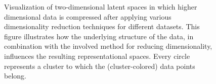 \begin{figure}[H]
\begin{adjustwidth}{-5cm}{-5cm}
{      \begin{adjustbox}{clip,trim=0.39cm 0.25cm 0.31cm 0.01cm}
          \scalebox{0.218}{}
      \end{adjustbox}
      
      \begin{adjustbox}{clip,trim=0.39cm 0.25cm 0.31cm 0.01cm}
          \scalebox{0.218}{}
      \end{adjustbox}
      
      \begin{adjustbox}{clip,trim=0.39cm 0.25cm 0.31cm 0.01cm}
          \scalebox{0.218}{}
      \end{adjustbox}
      
      \begin{adjustbox}{clip,trim=0.39cm 0.25cm 0.31cm 0.01cm}
          \scalebox{0.218}{}
      \end{adjustbox}
      
      \begin{adjustbox}{clip,trim=0.39cm 0.25cm 0.31cm 0.01cm}
          \scalebox{0.218}{}
      \end{adjustbox}
    }
    
    \label{fig:latentspaces}
  \end{adjustwidth} 
  \caption{Visualization of two-dimensional latent spaces in which higher dimensional data is compressed after applying various  dimensionality reduction techniques for different datasets. This figure illustrates how the underlying structure of the data, in combination with the involved method for reducing dimensionality, influences the resulting representational spaces. Every circle represents a cluster to which the (cluster-colored) data points belong.}
\end{figure}

